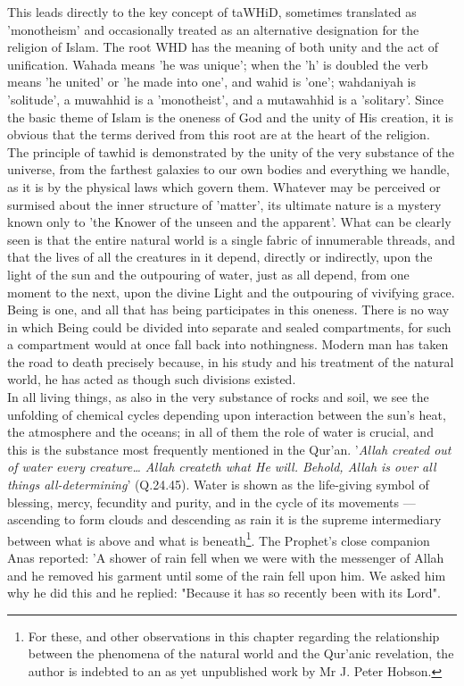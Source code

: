 \documentclass[11pt, b5paper, twoside]{book}
\begin{document}
This leads directly to the key concept of taWHiD, sometimes translated as 'monotheism' and 
occasionally treated as an alternative designation for the religion of Islam. The root WHD has the 
meaning of both unity and the act of unification. Wahada means 'he was unique'; when the 'h' is 
doubled the verb means 'he united' or 'he made into one', and wahid is 'one'; wahdaniyah is 
'solitude', a muwahhid is a 'monotheist', and a mutawahhid is a 'solitary'. Since the basic theme of 
Islam is the oneness of God and the unity of His creation, it is obvious that the terms derived from 
this root are at the heart of the religion. \\

The principle of tawhid is demonstrated by the unity of the very substance of the universe, from the 
farthest galaxies to our own bodies and everything we handle, as it is by the physical laws which 
govern them. Whatever may be perceived or surmised about the inner structure of 'matter', its 
ultimate nature is a mystery known only to 'the Knower of the unseen and the apparent'. What can be 
clearly seen is that the entire natural world is a single fabric of innumerable threads, and that the 
lives of all the creatures in it depend, directly or indirectly, upon the light of the sun and the 
outpouring of water, just as all depend, from one moment to the next, upon the divine Light and the 
outpouring of vivifying grace. Being is one, and all that has being participates in this oneness. 
There is no way in which Being could be divided into separate and sealed compartments, for such a 
compartment would at once fall back into nothingness. Modern man has taken the road to death 
precisely because, in his study and his treatment of the natural world, he has acted as though such 
divisions existed. \\

In all living things, as also in the very substance of rocks and soil, we see the unfolding of 
chemical cycles depending upon interaction between the sun's heat, the atmosphere and the oceans; in 
all of them the role of water is crucial, and this is the substance most frequently mentioned in the 
Qur'an. '\emph{Allah created out of water every creature\ldots{} Allah createth what He will. Behold, Allah is over all things all-determining}' (Q.24.45). Water is shown as the life-giving symbol of blessing, 
mercy, fecundity and purity, and in the cycle of its movements --- ascending to form clouds and 
descending as rain it is the supreme intermediary between what is above and what is beneath\footnote{For these, and other observations in this chapter regarding the relationship between the phenomena of the natural world and the Qur'anic revelation, the author is indebted to an as yet unpublished work by Mr J. Peter Hobson.}. The Prophet's close companion Anas reported: 'A shower of rain fell when we were with the messenger of Allah and he removed his garment until some of the rain fell upon him. We asked him why he did this and he replied: "Because it has so recently been with its Lord". \\
\end{document}
